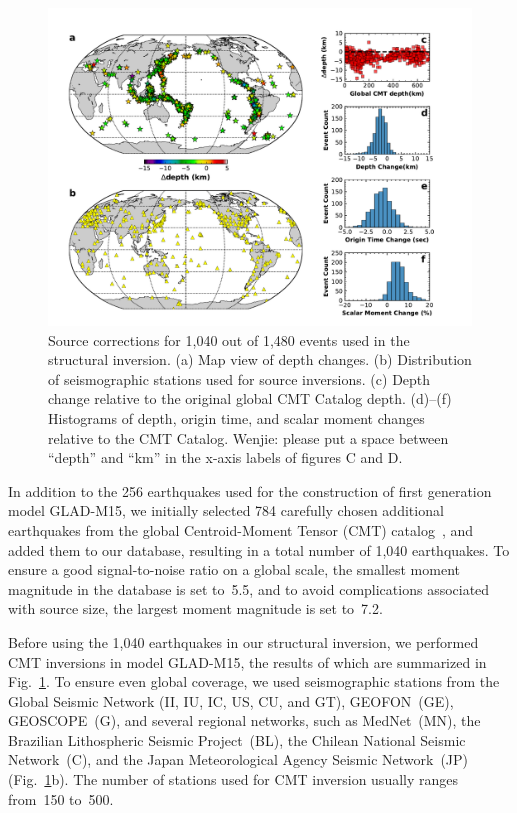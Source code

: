 \documentclass[extra,mreferee]{gji}
\begin{document}
\begin{figure}
  \centering
  \includegraphics[width=\textwidth]{figures/source_corrections.pdf}
  \caption{Source corrections for 1,040 out of 1,480 events used in the structural inversion. (a) Map view of depth changes. (b) Distribution of seismographic stations used for source inversions. (c) Depth change relative to the original global CMT Catalog depth. (d)--(f) Histograms of depth, origin time, and scalar moment changes relative to the CMT Catalog.
  {\color{red} Wenjie: please put a space between ``depth'' and ``km'' in the x-axis labels of figures C and D.}
  }
  \label{fig:source_correction}
\end{figure}

In addition to the 256 earthquakes used for the construction of first generation model GLAD-M15, we initially selected 784 carefully chosen additional earthquakes from the global Centroid-Moment Tensor (CMT) catalog~\citep[e.g.,][]{Ekstrom12},
and added them to our database, resulting in a total number of 1,040 earthquakes.
To ensure a good signal-to-noise ratio on a global scale,
the smallest moment magnitude in the database is set to~5.5,
and to avoid complications associated with source size,
the largest moment magnitude is set to~7.2.

Before using the 1,040 earthquakes in our structural inversion,
we performed CMT inversions in model GLAD-M15,
the results of which are summarized in Fig.~\ref{fig:source_correction}.
To ensure even global coverage,
we used seismographic stations from the  Global Seismic Network (II, IU, IC, US, CU, and GT),
GEOFON~(GE), GEOSCOPE~(G), and several regional networks, such as MedNet~(MN),
the Brazilian Lithospheric Seismic Project~(BL), the Chilean National Seismic Network~(C),
and the Japan Meteorological Agency Seismic Network~(JP) (Fig.~\ref{fig:source_correction}b).
The number of stations used for CMT inversion usually ranges
from~150 to~500.
\end{document}
